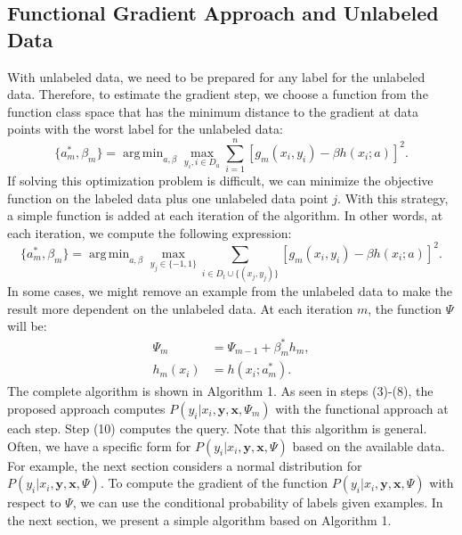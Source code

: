 \documentclass[12pt]{article}
\DeclareMathOperator*{\argmin}{arg\,min}
\begin{document}
	\subsection{Functional Gradient Approach and Unlabeled Data}
	With unlabeled data, we need to be prepared for any label for the unlabeled data. Therefore, to estimate the gradient step, we choose a function from the function class space that has the minimum distance to the gradient at data points with the worst label for the unlabeled data:
	\begin{equation}
		\{a_m^*, \beta_m\} = \argmin_{a, \beta} \max_{y_i, i \in D_u} \sum_{i=1}^{n} [g_m(x_i, y_i) - \beta h(x_i; a)]^2.
	\end{equation}
	If solving this optimization problem is difficult, we can minimize the objective function on the labeled data plus one unlabeled data point $j$. With this strategy, a simple function is added at each iteration of the algorithm. In other words, at each iteration, we compute the following expression:
	\begin{equation}
		\{a_m^*, \beta_m\} = \argmin_{a, \beta} \max_{y_j \in \{-1, 1\}} \sum_{i \in D_l \cup \{(x_j, y_j)\}} [g_m(x_i, y_i) - \beta h(x_i; a)]^2.
	\end{equation}
	In some cases, we might remove an example from the unlabeled data to make the result more dependent on the unlabeled data. At each iteration $m$, the function $\Psi$ will be:
	\begin{align}
		\Psi_m &= \Psi_{m-1} + \beta_m^* h_m, \\
		h_m(x_i) &= h(x_i; a_m^*).
	\end{align}
	The complete algorithm is shown in Algorithm 1. As seen in steps (3)-(8), the proposed approach computes $P(y_i | x_i, \mathbf{y}, \mathbf{x}, \Psi_m)$ with the functional approach at each step. Step (10) computes the query. Note that this algorithm is general. Often, we have a specific form for $P(y_i | x_i, \mathbf{y}, \mathbf{x}, \Psi)$ based on the available data. For example, the next section considers a normal distribution for $P(y_i | x_i, \mathbf{y}, \mathbf{x}, \Psi)$. To compute the gradient of the function $P(y_i | x_i, \mathbf{y}, \mathbf{x}, \Psi)$ with respect to $\Psi$, we can use the conditional probability of labels given examples. In the next section, we present a simple algorithm based on Algorithm 1.
	
\end{document}
